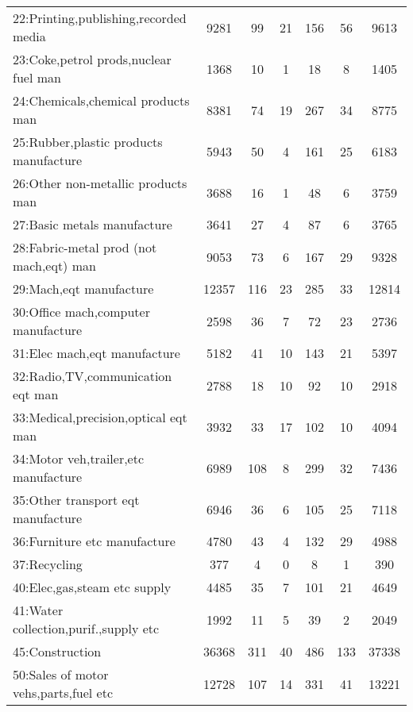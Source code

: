 {\begin{longtable}{l*{6}{c}}
22:Printing,publishing,recorded media&     9281&       99&       21&      156&       56&     9613\\
23:Coke,petrol prods,nuclear fuel man&     1368&       10&        1&       18&        8&     1405\\
24:Chemicals,chemical products man&     8381&       74&       19&      267&       34&     8775\\
25:Rubber,plastic products manufacture&     5943&       50&        4&      161&       25&     6183\\
26:Other non-metallic products man&     3688&       16&        1&       48&        6&     3759\\
27:Basic metals manufacture&     3641&       27&        4&       87&        6&     3765\\
28:Fabric-metal prod (not mach,eqt) man&     9053&       73&        6&      167&       29&     9328\\
29:Mach,eqt manufacture&    12357&      116&       23&      285&       33&    12814\\
30:Office mach,computer manufacture&     2598&       36&        7&       72&       23&     2736\\
31:Elec mach,eqt manufacture&     5182&       41&       10&      143&       21&     5397\\
32:Radio,TV,communication eqt man&     2788&       18&       10&       92&       10&     2918\\
33:Medical,precision,optical eqt man&     3932&       33&       17&      102&       10&     4094\\
34:Motor veh,trailer,etc manufacture&     6989&      108&        8&      299&       32&     7436\\
35:Other transport eqt manufacture&     6946&       36&        6&      105&       25&     7118\\
36:Furniture etc manufacture&     4780&       43&        4&      132&       29&     4988\\
37:Recycling&      377&        4&        0&        8&        1&      390\\
40:Elec,gas,steam etc supply&     4485&       35&        7&      101&       21&     4649\\
41:Water collection,purif.,supply etc&     1992&       11&        5&       39&        2&     2049\\
45:Construction&    36368&      311&       40&      486&      133&    37338\\
50:Sales of motor vehs,parts,fuel etc&    12728&      107&       14&      331&       41&    13221\\

\end{longtable}}
